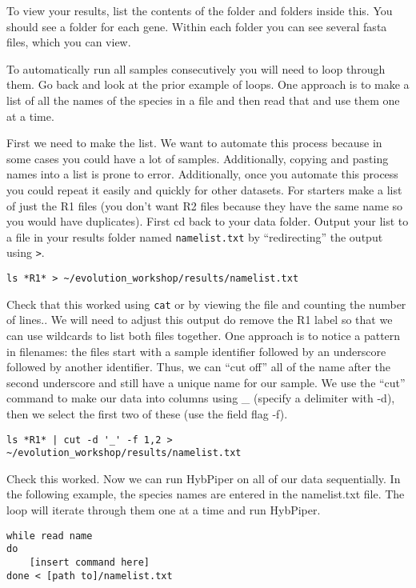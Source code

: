 \documentclass[
]{book}
\begin{document}
To view your results, list the contents of the folder and folders inside this.
You should see a folder for each gene.
Within each folder you can see several fasta files, which you can view.

To automatically run all samples consecutively you will need to loop through them.
Go back and look at the prior example of loops.
One approach is to make a list of all the names of the species in a file and then read that and use them one at a time.

First we need to make the list. We want to automate this process because in some cases you could have a lot of samples. Additionally, copying and pasting names into a list is prone to error.
Additionally, once you automate this process you could repeat it easily and quickly for other datasets.
For starters make a list of just the R1 files (you don't want R2 files because they have the same name so you would have duplicates).
First cd back to your data folder.
Output your list to a file in your results folder named \texttt{namelist.txt} by ``redirecting'' the output using \texttt{\textgreater{}}.

\begin{verbatim}
ls *R1* > ~/evolution_workshop/results/namelist.txt 
\end{verbatim}

Check that this worked using \texttt{cat} or by viewing the file and counting the number of lines..
We will need to adjust this output do remove the R1 label so that we can use wildcards to list both files together.
One approach is to notice a pattern in filenames: the files start with a sample identifier followed by an underscore followed by another identifier.
Thus, we can ``cut off'' all of the name after the second underscore and still have a unique name for our sample.
We use the ``cut'' command to make our data into columns using \_ (specify a delimiter with -d), then we select the first two of these (use the field flag -f).

\begin{verbatim}
ls *R1* | cut -d '_' -f 1,2 > ~/evolution_workshop/results/namelist.txt 
\end{verbatim}

Check this worked.
Now we can run HybPiper on all of our data sequentially.
In the following example, the species names are entered in the namelist.txt file.
The loop will iterate through them one at a time and run HybPiper.

\begin{verbatim}
while read name
do 
    [insert command here]
done < [path to]/namelist.txt
\end{verbatim}
\end{document}
